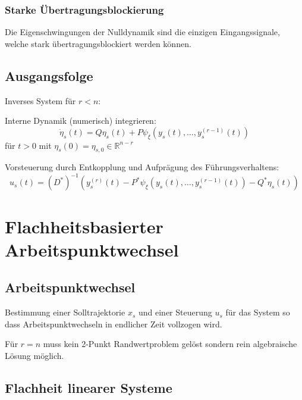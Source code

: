 \subsubsection{Starke Übertragungsblockierung}
Die Eigenschwingungen der Nulldynamik sind die einzigen Eingangssignale, welche stark
übertragungsblockiert werden können.

\subsection{Ausgangsfolge}
Inverses System für $r<n$:

Interne Dynamik (numerisch) integrieren:
\begin{equation}
    \dot{\eta}_s(t) = Q \eta_s(t) + P \psi_\xi(y_s(t), \ldots, y_s^{(r-1)}(t))
\end{equation}
für $t>0$ mit $\eta_s(0) = \eta_{s,0} \in \mathbb{R}^{n-r}$

Vorsteuerung durch Entkopplung und Aufprägung des Führungsverhaltens:
\begin{equation}
        u_s(t) = {(D^*)}^{-1} \left(y_s^{(r)}(t) - P^* \psi_\xi\left(y_s(t), \ldots, y_s^{(r-1)}(t)\right)
        - Q^* \eta_s(t)\right)
\end{equation}

\section{Flachheitsbasierter Arbeitspunktwechsel}
\subsection{Arbeitspunktwechsel}
Bestimmung einer Solltrajektorie $x_s$ und einer Steuerung $u_s$ für
das System so dass Arbeitspunktwechseln in endlicher Zeit vollzogen wird.

Für $r=n$ muss kein 2-Punkt Randwertproblem gelöst sondern rein algebraische
Lösung möglich.

\subsection{Flachheit linearer Systeme}
